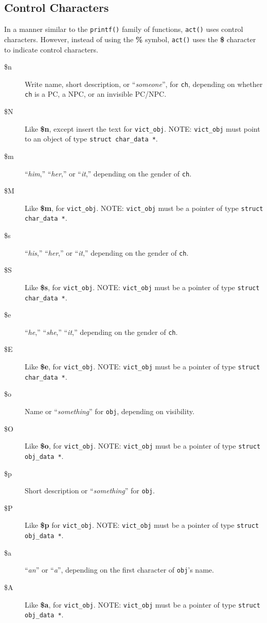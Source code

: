 \documentclass[11pt]{article}
\begin{document}
\subsection{Control Characters}\label{controlcharacters}
In a manner similar to the \texttt{printf()} family of functions, \texttt{act()} uses control characters.  However, instead of using the {\bf \%} symbol, \texttt{act()} uses the {\bf \$} character to indicate control characters.
\begin{description}
\item[\$n] Write name, short description, or ``{\it someone}'', for \texttt{ch}, depending on whether \texttt{ch} is a PC, a NPC, or an invisible PC/NPC.
\item[\$N] Like {\bf \$n}, except insert the text for \texttt{vict\_obj}. NOTE: \texttt{vict\_obj} must point to an object of type \texttt{struct char\_data~*}.
\item[\$m] ``{\it him},'' ``{\it her},'' or ``{\it it},'' depending on the gender of \texttt{ch}.
\item[\$M]  Like {\bf \$m}, for \texttt{vict\_obj}. NOTE: \texttt{vict\_obj} must be a pointer of type \texttt{struct char\_data~*}.
\item[\$s] ``{\it his},'' ``{\it her},'' or ``{\it it},'' depending on the gender of \texttt{ch}.
\item[\$S] Like {\bf \$s}, for \texttt{vict\_obj}. NOTE: \texttt{vict\_obj} must be a pointer of type \texttt{struct char\_data~*}.
\item[\$e] ``{\it he},'' ``{\it she},'' ``{\it it},'' depending on the gender of \texttt{ch}.
\item[\$E] Like {\bf \$e}, for \texttt{vict\_obj}. NOTE: \texttt{vict\_obj} must be a pointer of type \texttt{struct char\_data~*}.
\item[\$o] Name or ``{\it something}'' for \texttt{obj}, depending on visibility.
\item[\$O] Like {\bf \$o}, for \texttt{vict\_obj}. NOTE: \texttt{vict\_obj} must be a pointer of type \texttt{struct obj\_data~*}.
\item[\$p] Short description or ``{\it something}'' for \texttt{obj}.
\item[\$P] Like {\bf \$p} for \texttt{vict\_obj}. NOTE: \texttt{vict\_obj} must be a pointer of type \texttt{struct obj\_data~*}.
\item[\$a] ``{\it an}'' or ``{\it a}'', depending on the first character of \texttt{obj}'s name.
\item[\$A] Like {\bf \$a}, for \texttt{vict\_obj}. NOTE: \texttt{vict\_obj} must be a pointer of type \texttt{struct obj\_data~*}.

\end{description}
\end{document}
